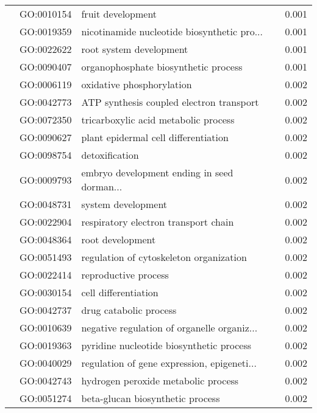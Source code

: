 \begin{longtable}{lllr}
   & GO:0010154 &                            fruit development &         0.001 \\
   & GO:0019359 &  nicotinamide nucleotide biosynthetic pro... &         0.001 \\
   & GO:0022622 &                      root system development &         0.001 \\
   & GO:0090407 &         organophosphate biosynthetic process &         0.001 \\
   & GO:0006119 &                    oxidative phosphorylation &         0.002 \\
   & GO:0042773 &     ATP synthesis coupled electron transport &         0.002 \\
   & GO:0072350 &         tricarboxylic acid metabolic process &         0.002 \\
   & GO:0090627 &         plant epidermal cell differentiation &         0.002 \\
   & GO:0098754 &                               detoxification &         0.002 \\
   & GO:0009793 &  embryo development ending in seed dorman... &         0.002 \\
   & GO:0048731 &                           system development &         0.002 \\
   & GO:0022904 &         respiratory electron transport chain &         0.002 \\
   & GO:0048364 &                             root development &         0.002 \\
   & GO:0051493 &      regulation of cytoskeleton organization &         0.002 \\
   & GO:0022414 &                         reproductive process &         0.002 \\
   & GO:0030154 &                         cell differentiation &         0.002 \\
   & GO:0042737 &                       drug catabolic process &         0.002 \\
   & GO:0010639 &  negative regulation of organelle organiz... &         0.002 \\
   & GO:0019363 &     pyridine nucleotide biosynthetic process &         0.002 \\
   & GO:0040029 &  regulation of gene expression, epigeneti... &         0.002 \\
   & GO:0042743 &          hydrogen peroxide metabolic process &         0.002 \\
   & GO:0051274 &             beta-glucan biosynthetic process &         0.002 \\

\end{longtable}
